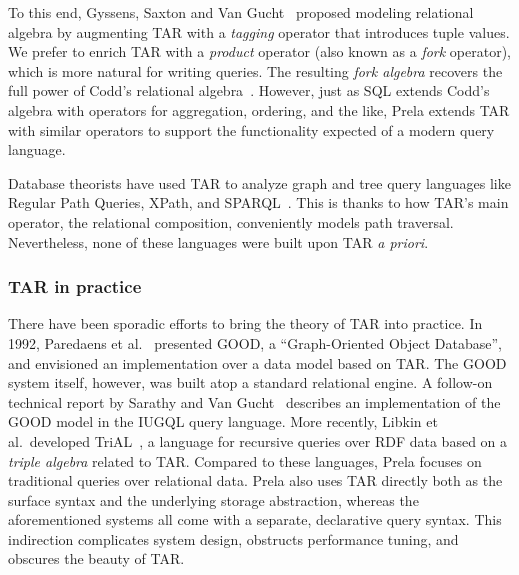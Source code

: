 \documentclass[sigconf,screen,pbalance]{cidr-2027}
\newcommand{\noun}[1]{\textsf{#1}}
\newcommand{\code}{\lstinline[style=prela]}
\begin{document}
To this end, Gyssens, Saxton and Van Gucht~\cite{DBLP:books/mk/freytagMV91/GyssensSG91} proposed modeling relational algebra by augmenting \noun{TAR} with a \emph{tagging} operator that introduces tuple values.
We prefer to enrich \noun{TAR} with a \emph{product} operator (also known as a \emph{fork} operator), which is more natural for writing queries.
The resulting \emph{fork algebra} recovers the full power of Codd's relational algebra~\cite{haebererForkAlgebras1997}.
However, just as SQL extends Codd's algebra with operators for aggregation, ordering, and the like, Prela extends \noun{TAR} with similar operators to support the functionality expected of a modern query language.

Database theorists have used \noun{TAR} to analyze graph and tree query languages like Regular Path Queries, XPath, and SPARQL~\cite{DBLP:conf/icdt/FletcherGLBGVW11,DBLP:journals/jacm/LibkinMV16,DBLP:journals/igpl/SurinxFGLBGVW15,DBLP:journals/jlap/HellingsWGG22}.
This is thanks to how \noun{TAR}'s main operator, the relational composition, conveniently models path traversal.
Nevertheless, none of these languages were built upon \noun{TAR} \emph{a priori}.

\subsubsection*{\noun{TAR} in practice}
There have been sporadic efforts to bring the theory of \noun{TAR} into practice.
In 1992, Paredaens et al.~\cite{DBLP:journals/sigmod/ParedaensBAGGTGSS92} presented \noun{GOOD}, a ``Graph-Oriented Object Database'', and envisioned an implementation over a data model based on \noun{TAR}.
The \noun{GOOD} system itself, however, was built atop a standard relational engine.
A follow-on technical report by Sarathy and Van Gucht~\cite{sarathy1993implementation} describes an implementation of the \noun{GOOD} model in the \noun{IUGQL} query language.
More recently, Libkin et al.\ developed \noun{TriAL}~\cite{DBLP:journals/tods/LibkinRSV18}, a language for recursive queries over RDF data based on a \emph{triple algebra} related to \noun{TAR}.
Compared to these languages, Prela focuses on traditional queries over relational data.
Prela also uses \noun{TAR} directly both as the surface syntax and the underlying storage abstraction, whereas the aforementioned systems all come with a separate, declarative query syntax.
This indirection complicates system design, obstructs performance tuning, and obscures the beauty of \noun{TAR}.
\end{document}
